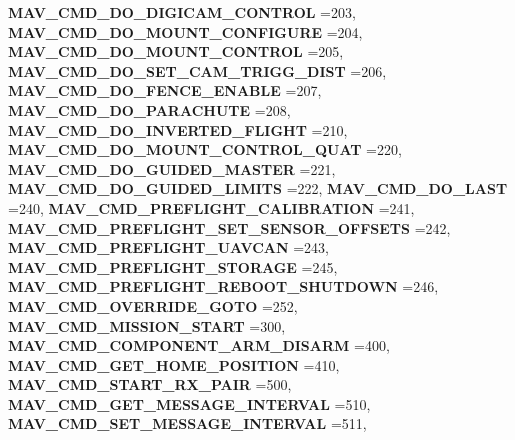 \begin{DoxyCompactItemize}
\newline
\textbf{ M\+A\+V\+\_\+\+C\+M\+D\+\_\+\+D\+O\+\_\+\+D\+I\+G\+I\+C\+A\+M\+\_\+\+C\+O\+N\+T\+R\+OL} =203, 
\textbf{ M\+A\+V\+\_\+\+C\+M\+D\+\_\+\+D\+O\+\_\+\+M\+O\+U\+N\+T\+\_\+\+C\+O\+N\+F\+I\+G\+U\+RE} =204, 
\textbf{ M\+A\+V\+\_\+\+C\+M\+D\+\_\+\+D\+O\+\_\+\+M\+O\+U\+N\+T\+\_\+\+C\+O\+N\+T\+R\+OL} =205, 
\textbf{ M\+A\+V\+\_\+\+C\+M\+D\+\_\+\+D\+O\+\_\+\+S\+E\+T\+\_\+\+C\+A\+M\+\_\+\+T\+R\+I\+G\+G\+\_\+\+D\+I\+ST} =206, 
\newline
\textbf{ M\+A\+V\+\_\+\+C\+M\+D\+\_\+\+D\+O\+\_\+\+F\+E\+N\+C\+E\+\_\+\+E\+N\+A\+B\+LE} =207, 
\textbf{ M\+A\+V\+\_\+\+C\+M\+D\+\_\+\+D\+O\+\_\+\+P\+A\+R\+A\+C\+H\+U\+TE} =208, 
\textbf{ M\+A\+V\+\_\+\+C\+M\+D\+\_\+\+D\+O\+\_\+\+I\+N\+V\+E\+R\+T\+E\+D\+\_\+\+F\+L\+I\+G\+HT} =210, 
\textbf{ M\+A\+V\+\_\+\+C\+M\+D\+\_\+\+D\+O\+\_\+\+M\+O\+U\+N\+T\+\_\+\+C\+O\+N\+T\+R\+O\+L\+\_\+\+Q\+U\+AT} =220, 
\newline
\textbf{ M\+A\+V\+\_\+\+C\+M\+D\+\_\+\+D\+O\+\_\+\+G\+U\+I\+D\+E\+D\+\_\+\+M\+A\+S\+T\+ER} =221, 
\textbf{ M\+A\+V\+\_\+\+C\+M\+D\+\_\+\+D\+O\+\_\+\+G\+U\+I\+D\+E\+D\+\_\+\+L\+I\+M\+I\+TS} =222, 
\textbf{ M\+A\+V\+\_\+\+C\+M\+D\+\_\+\+D\+O\+\_\+\+L\+A\+ST} =240, 
\textbf{ M\+A\+V\+\_\+\+C\+M\+D\+\_\+\+P\+R\+E\+F\+L\+I\+G\+H\+T\+\_\+\+C\+A\+L\+I\+B\+R\+A\+T\+I\+ON} =241, 
\newline
\textbf{ M\+A\+V\+\_\+\+C\+M\+D\+\_\+\+P\+R\+E\+F\+L\+I\+G\+H\+T\+\_\+\+S\+E\+T\+\_\+\+S\+E\+N\+S\+O\+R\+\_\+\+O\+F\+F\+S\+E\+TS} =242, 
\textbf{ M\+A\+V\+\_\+\+C\+M\+D\+\_\+\+P\+R\+E\+F\+L\+I\+G\+H\+T\+\_\+\+U\+A\+V\+C\+AN} =243, 
\textbf{ M\+A\+V\+\_\+\+C\+M\+D\+\_\+\+P\+R\+E\+F\+L\+I\+G\+H\+T\+\_\+\+S\+T\+O\+R\+A\+GE} =245, 
\textbf{ M\+A\+V\+\_\+\+C\+M\+D\+\_\+\+P\+R\+E\+F\+L\+I\+G\+H\+T\+\_\+\+R\+E\+B\+O\+O\+T\+\_\+\+S\+H\+U\+T\+D\+O\+WN} =246, 
\newline
\textbf{ M\+A\+V\+\_\+\+C\+M\+D\+\_\+\+O\+V\+E\+R\+R\+I\+D\+E\+\_\+\+G\+O\+TO} =252, 
\textbf{ M\+A\+V\+\_\+\+C\+M\+D\+\_\+\+M\+I\+S\+S\+I\+O\+N\+\_\+\+S\+T\+A\+RT} =300, 
\textbf{ M\+A\+V\+\_\+\+C\+M\+D\+\_\+\+C\+O\+M\+P\+O\+N\+E\+N\+T\+\_\+\+A\+R\+M\+\_\+\+D\+I\+S\+A\+RM} =400, 
\textbf{ M\+A\+V\+\_\+\+C\+M\+D\+\_\+\+G\+E\+T\+\_\+\+H\+O\+M\+E\+\_\+\+P\+O\+S\+I\+T\+I\+ON} =410, 
\newline
\textbf{ M\+A\+V\+\_\+\+C\+M\+D\+\_\+\+S\+T\+A\+R\+T\+\_\+\+R\+X\+\_\+\+P\+A\+IR} =500, 
\textbf{ M\+A\+V\+\_\+\+C\+M\+D\+\_\+\+G\+E\+T\+\_\+\+M\+E\+S\+S\+A\+G\+E\+\_\+\+I\+N\+T\+E\+R\+V\+AL} =510, 
\textbf{ M\+A\+V\+\_\+\+C\+M\+D\+\_\+\+S\+E\+T\+\_\+\+M\+E\+S\+S\+A\+G\+E\+\_\+\+I\+N\+T\+E\+R\+V\+AL} =511, 

\end{DoxyCompactItemize}
